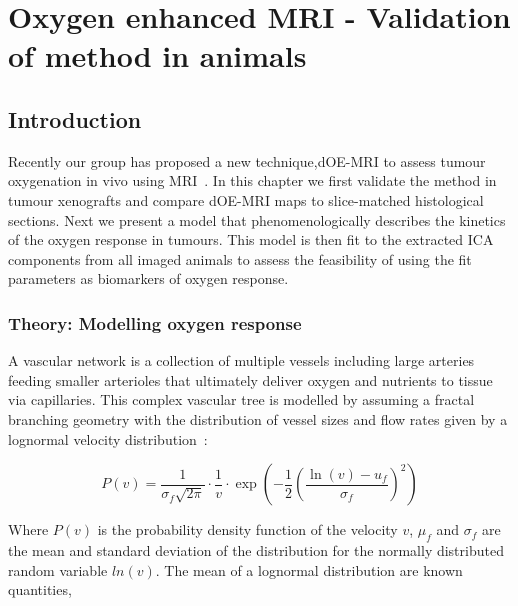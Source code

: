 
\chapter{Oxygen enhanced MRI - Validation of method in animals}
\label{ch:oemri2}

\section{Introduction}

Recently our group has proposed a new technique,\ac{dOE-MRI} to assess tumour oxygenation in vivo using MRI~\cite{Moosvi:2018ca}.
In this chapter we first validate the method in tumour xenografts and compare \ac{dOE-MRI} maps to slice-matched histological sections.
Next we present a model that phenomenologically describes the kinetics of the oxygen response in tumours. 
This model is then fit to the extracted \ac{ICA} components from all imaged animals to assess the feasibility of using the fit parameters as biomarkers of oxygen response.

\subsection{Theory: Modelling oxygen response}
\label{sec:lognormalfitting_theory}
A vascular network is a collection of multiple vessels including large arteries feeding smaller arterioles that ultimately deliver oxygen and nutrients to tissue via capillaries.
This complex vascular tree is modelled by assuming a fractal branching geometry with the distribution of vessel sizes and flow rates given by a lognormal velocity distribution~\cite{Qian:2000ca}:

\begin{equation}
P(v)=\frac{1}{\sigma_{f} \sqrt{2 \pi}} \cdot \frac{1}{v} \cdot \exp \left(-\frac{1}{2}\left(\frac{\ln (v)-u_{f}}{\sigma_{f}}\right)^{2}\right)
\end{equation}

Where $P(v)$ is the probability density function of the velocity $v$, $\mu_f$ and $\sigma_f$ are the mean and standard deviation of the distribution for the normally distributed random variable $ln(v)$.
The mean of a lognormal distribution are known quantities,

